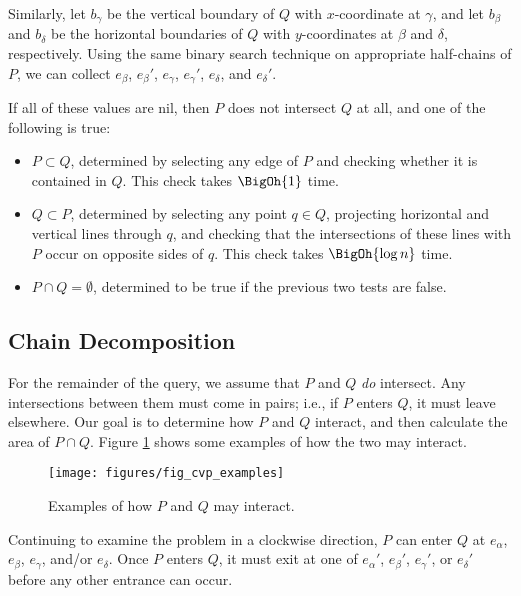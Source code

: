 Similarly, let $b_\gamma$ be the vertical boundary of $Q$ with $x$-coordinate at $\gamma$, and let $b_\beta$ and $b_\delta$ be the horizontal boundaries of $Q$ with $y$-coordinates at $\beta$ and $\delta$, respectively.  Using the same binary search technique on appropriate half-chains of $P$, we can collect $e_\beta$, $e_\beta'$, $e_\gamma$, $e_\gamma'$, $e_\delta$, and $e_\delta'$.  

If all of these values are nil, then $P$ does not intersect $Q$ at all, and one of the following is true:

\begin{itemize}
 \item $P \subset Q$, determined by selecting any edge of $P$ and checking whether it is contained in $Q$. This check takes $\BigOh{1}$ time.

 \item $Q \subset P$, determined by selecting any point $q \in Q$, projecting horizontal and vertical lines through $q$, and checking that the intersections of these lines with $P$ occur on opposite sides of $q$. This check takes $\BigOh{\log{n}}$ time.

 \item $P \cap Q = \emptyset$, determined to be true if the previous two tests are false.
\end{itemize}


\subsection{Chain Decomposition}

For the remainder of the query, we assume that $P$ and $Q$ \emph{do} intersect. 
Any intersections between them must come in pairs; i.e., if $P$ enters $Q$, it must leave elsewhere.
Our goal is to determine how $P$ and $Q$ interact, and then calculate the area of $P \cap Q$.  Figure \ref{fig:convexp:examples} shows some examples of how the two may interact.

\begin{figure}[t]
\begin{center}
  \texttt{[image: figures/fig\_cvp\_examples]}
  \caption{Examples of how $P$ and $Q$ may interact.}
  \label{fig:convexp:examples}
\end{center}
\end{figure}

Continuing to examine the problem in a clockwise direction, $P$ can enter $Q$ at $e_\alpha$, $e_\beta$, $e_\gamma$, and/or $e_\delta$.  Once $P$ enters $Q$, it must exit at one of $e_\alpha'$, $e_\beta'$, $e_\gamma'$, or $e_\delta'$ before any other entrance can occur.

